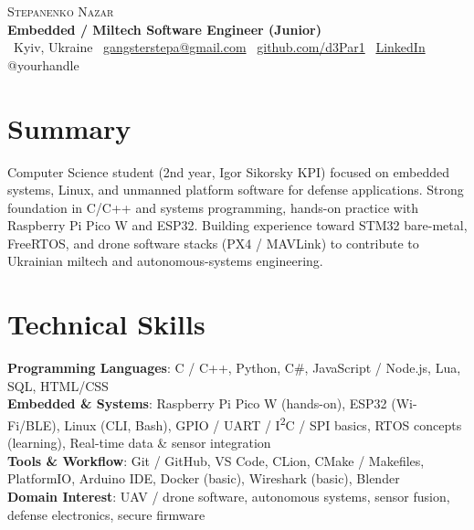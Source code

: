 \documentclass[letterpaper,11pt]{article}
\begin{document}
\begin{center}
    {\Huge \scshape Stepanenko Nazar} \\ \vspace{4pt}
    \small {\color{accent}\textbf{Embedded / Miltech Software Engineer (Junior)}} \\ \vspace{4pt}
    \faMapMarker* \, Kyiv, Ukraine \quad
    \faEnvelope \, \href{mailto:gangsterstepa@gmail.com}{gangsterstepa@gmail.com} \quad
    \faGithub \, \href{https://github.com/d3Par1}{github.com/d3Par1} \quad
    \faLinkedin \, \href{https://www.linkedin.com/in/yourhandle}{LinkedIn} \quad
    \faTelegram \, @yourhandle
\end{center}

\section{Summary}
\small
Computer Science student (2nd year, Igor Sikorsky KPI) focused on embedded systems, Linux, and unmanned platform software for defense applications. Strong foundation in C/C++ and systems programming, hands-on practice with Raspberry Pi Pico W and ESP32. Building experience toward STM32 bare-metal, FreeRTOS, and drone software stacks (PX4 / MAVLink) to contribute to Ukrainian miltech and autonomous-systems engineering.
\vspace{-6pt}

\section{Technical Skills}
\begin{itemize}[leftmargin=0.15in, label={}]
    \small{\item{
     \textbf{Programming Languages}{: C / C++, Python, C\#, JavaScript / Node.js, Lua, SQL, HTML/CSS} \\
     \textbf{Embedded \& Systems}{: Raspberry Pi Pico W (hands-on), ESP32 (Wi-Fi/BLE), Linux (CLI, Bash), GPIO / UART / I\textsuperscript{2}C / SPI basics, RTOS concepts (learning), Real-time data \& sensor integration} \\
     \textbf{Tools \& Workflow}{: Git / GitHub, VS Code, CLion, CMake / Makefiles, PlatformIO, Arduino IDE, Docker (basic), Wireshark (basic), Blender} \\
     \textbf{Domain Interest}{: UAV / drone software, autonomous systems, sensor fusion, defense electronics, secure firmware}
    }}
\end{itemize}
\vspace{-16pt}
\end{document}
